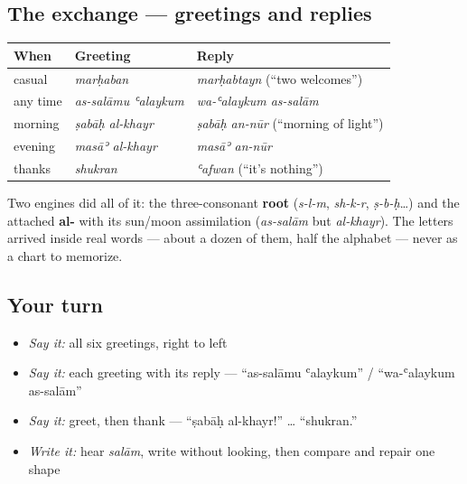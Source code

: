 \subsection*{The exchange — greetings and replies}
\noindent
\begin{tabularx}{\linewidth}{@{}>{\raggedright\arraybackslash}X>{\raggedright\arraybackslash}X>{\raggedright\arraybackslash}X@{}}
\toprule
\textbf{When} & \textbf{Greeting} & \textbf{Reply} \\
\midrule
casual & \emph{marḥaban} & \emph{marḥabtayn} (\textquotedblleft{}two welcomes\textquotedblright{}) \\
any time & \emph{as-salāmu ʿalaykum} & \emph{wa-ʿalaykum as-salām} \\
morning & \emph{ṣabāḥ al-khayr} & \emph{ṣabāḥ an-nūr} (\textquotedblleft{}morning of light\textquotedblright{}) \\
evening & \emph{masāʾ al-khayr} & \emph{masāʾ an-nūr} \\
thanks & \emph{shukran} & \emph{ʿafwan} (\textquotedblleft{}it's nothing\textquotedblright{}) \\
\bottomrule
\end{tabularx}

Two engines did all of it: the three-consonant \textbf{root} (\emph{s-l-m}, \emph{sh-k-r}, \emph{ṣ-b-ḥ}…) and the attached \textbf{al-} with its sun/moon assimilation (\emph{as-salām} but \emph{al-khayr}). The letters arrived inside real words — about a dozen of them, half the alphabet — never as a chart to memorize.

\subsection*{Your turn}
\begin{itemize}
\raggedright
  \item \emph{Say it:} all six greetings, right to left
  \item \emph{Say it:} each greeting with its reply — \textquotedblleft{}as-salāmu ʿalaykum\textquotedblright{} / \textquotedblleft{}wa-ʿalaykum as-salām\textquotedblright{}
  \item \emph{Say it:} greet, then thank — \textquotedblleft{}ṣabāḥ al-khayr!\textquotedblright{} … \textquotedblleft{}shukran.\textquotedblright{}
  \item \emph{Write it:} hear \emph{salām}, write \textbf{} without looking, then compare and repair one shape
\end{itemize}


